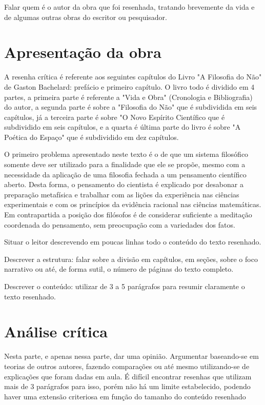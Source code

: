 \documentclass[11pt]{article}
\begin{document}
    Falar quem é o autor da obra que foi resenhada, tratando brevemente da vida e de algumas outras obras do escritor ou pesquisador.

\section{Apresentação da obra}

    A resenha crítica é referente aos seguintes capítulos do Livro "A Filosofia do Não" de Gaston Bachelard: prefácio e primeiro capítulo. O livro todo é dividido em 4 partes, a primeira parte é referente a "Vida e Obra" (Cronologia e Bibliografia) do autor, a segunda parte é sobre a "Filosofia do Não" que é subdividida em seis capítulos, já a terceira parte é sobre "O Novo Espírito Científico que é subdividido em seis capítulos, e a quarta é última parte do livro é sobre "A Poética do Espaço" que é subdividido em dez capítulos. 



O primeiro problema apresentado neste texto é o de que um sistema filosófico somente deve ser utilizado para a finalidade que ele se propõe, mesmo com a necessidade da aplicação de uma filosofia fechada a um pensamento científico aberto. Desta forma, o pensamento do cientista é explicado por desabonar a preparação metafísica e trabalhar com as lições da experiência nas ciências experimentais e com os princípios da evidência racional nas ciências matemáticas. Em contrapartida a posição dos filósofos é de considerar suficiente a meditação coordenada do pensamento, sem preocupação com a variedades dos fatos.


Situar o leitor descrevendo em poucas linhas todo o conteúdo do texto resenhado.

Descrever a estrutura: falar sobre a divisão em capítulos, em seções, sobre o foco narrativo ou até, de forma sutil, o número de páginas do texto completo.

Descrever o conteúdo: utilizar de 3 a 5 parágrafos para resumir claramente o texto resenhado.

\section{Análise crítica}
Nesta parte, e apenas nessa parte, dar uma opinião. Argumentar baseando-se em teorias de outros autores, fazendo comparações ou até mesmo utilizando-se de explicações que foram dadas em aula. É difícil encontrar resenhas que utilizam mais de 3 parágrafos para isso, porém não há um limite estabelecido, podendo haver uma extensão criteriosa em função do tamanho do conteúdo resenhado
\end{document}
